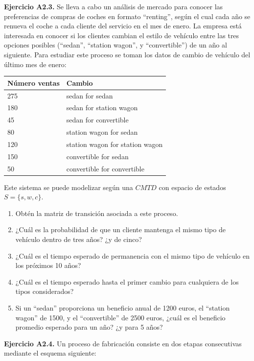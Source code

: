 \documentclass[
]{book}
\providecommand{\tightlist}{%
  \setlength{\itemsep}{0pt}\setlength{\parskip}{0pt}}
\theoremstyle{definition}
\theoremstyle{definition}
\theoremstyle{definition}
\theoremstyle{definition}
\theoremstyle{remark}
\begin{document}
\textbf{Ejercicio A2.3.} Se lleva a cabo un análisis de mercado para conocer las preferencias de compras de coches en formato ``renting'', según el cual cada año se renueva el coche a cada cliente del servicio en el mes de enero. La empresa está interesada en conocer si los clientes cambian el estilo de vehículo entre las tres opciones posibles (``sedan'', ``station wagon'', y ``convertible'') de un año al siguiente. Para estudiar este proceso se toman los datos de cambio de vehículo del último mes de enero:

\begin{longtable}[]{@{}ll@{}}
\toprule
Número ventas & Cambio \\
\midrule
\endhead
275 & sedan for sedan \\
180 & sedan for station wagon \\
45 & sedan for convertible \\
80 & station wagon for sedan \\
120 & station wagon for station wagon \\
150 & convertible for sedan \\
50 & convertible for convertible \\
\bottomrule
\end{longtable}

Este sistema se puede modelizar según una \(CMTD\) con espacio de estados \(S = \{s, w, c\}\).

\begin{enumerate}
\def\labelenumi{\arabic{enumi}.}
\tightlist
\item
  Obtén la matriz de transición asociada a este proceso.
\item
  ¿Cuál es la probabilidad de que un cliente mantenga el mismo tipo de vehículo dentro de tres años? ¿y de cinco?
\item
  ¿Cuál es el tiempo esperado de permanencia con el mismo tipo de vehículo en los próximos 10 años?
\item
  ¿Cuál es el tiempo esperado hasta el primer cambio para cualquiera de los tipos considerados?
\item
  Si un ``sedan'' proporciona un beneficio anual de 1200 euros, el ``station wagon'' de 1500, y el ``convertible'' de 2500 euros, ¿cuál es el beneficio promedio esperado para un año? ¿y para 5 años?
\end{enumerate}

\textbf{Ejercicio A2.4.} Un proceso de fabricación consiste en dos etapas consecutivas mediante el esquema siguiente:
\end{document}
